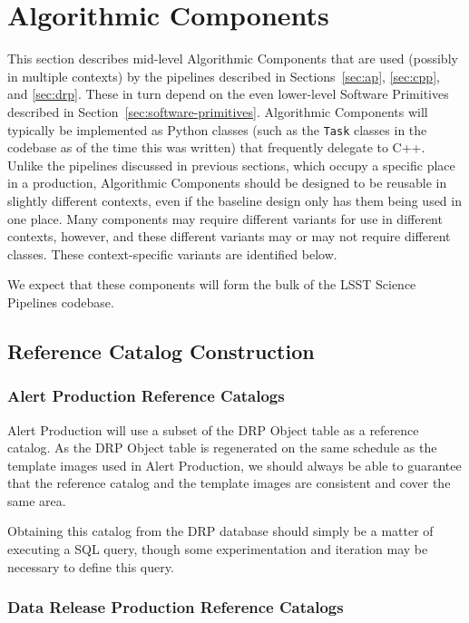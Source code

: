 \section{Algorithmic Components}
\label{sec:algorithmic-components}

This section describes mid-level Algorithmic Components that are used (possibly in multiple contexts) by the pipelines described in Sections~\ref{sec:ap}, \ref{sec:cpp}, and \ref{sec:drp}.  These in turn depend on the even lower-level Software Primitives described in Section~\ref{sec:software-primitives}.  Algorithmic Components will typically be implemented as Python classes (such as the \texttt{Task} classes in the codebase as of the time this was written) that frequently delegate to C++.  Unlike the pipelines discussed in previous sections, which occupy a specific place in a production, Algorithmic Components should be designed to be reusable in slightly different contexts, even if the baseline design only has them being used in one place.  Many components may require different variants for use in different contexts, however, and these different variants may or may not require different classes.  These context-specific variants are identified below.

We expect that these components will form the bulk of the LSST Science Pipelines codebase.

\subsection{Reference Catalog Construction}
\label{sec:acReferenceCats}

\subsubsection{Alert Production Reference Catalogs}
\label{sec:acAlertProductionReferenceCatalogs}

Alert Production will use a subset of the DRP Object table as a reference catalog.  As the DRP Object table is regenerated on the same schedule as the template images used in Alert Production, we should always be able to guarantee that the reference catalog and the template images are consistent and cover the same area.

Obtaining this catalog from the DRP database should simply be a matter of executing a SQL query, though some experimentation and iteration may be necessary to define this query.

\subsubsection{Data Release Production Reference Catalogs}
\label{sec:acDataReleaseProductionReferenceCatalogs}

